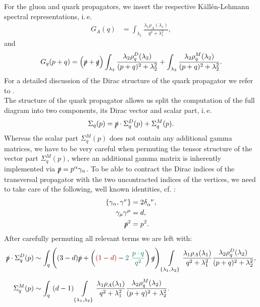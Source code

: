 For the gluon and quark propagators, we insert the respective  K\"all\'{e}n-Lehmann spectral representations, i.\,e.
\begin{align} 
G_A(q)&=\int_{\lambda_1} \frac{\lambda_1\rho_A(\lambda_1)}{q^{2}+\lambda_1^{2}},
\end{align}
and
\begin{equation}
\begin{aligned}
G_q(p+q) = \left(\slashed{p} + \slashed{q}\right) \int_{\lambda_2} \frac{\lambda_2\rho_{q}^D(\lambda_2)}{(p+q)^{2}+\lambda_2^2}+\int_{\lambda_2} \frac{\lambda_2\rho_q^M(\lambda_2)}{(p+q)^{2}+\lambda_2^2}.
\end{aligned}
\end{equation}
For a detailed discussion of the Dirac structure of the quark propagator we refer to . \\
The structure of the quark propagator allows us split the computation of the full diagram into two components, its Dirac vector and scalar part, i.\,e.
\begin{equation}
	\Sigma_q(p) =\slashed{p}\cdot\Sigma_{q}^D(p) + \Sigma_{q}^M(p).
\end{equation}
Whereas the scalar part $\Sigma_{q}^M(p)$ does not contain any additional gamma matrices, we have to be very careful when permuting the tensor structure of the vector part $\Sigma_{q}^M(p)$, where an additional gamma matrix is inherently implemented via $\slashed{p}= p^{\alpha}\gamma_{\alpha}$. To be able to contract the Dirac indices of the transversal propagator with the two uncontracted indices of the vertices, we need to take care of the following, well known identities, cf. \cite{PeskinSchroeder1995}:
\begin{align}
\left\{\gamma_{\alpha},\gamma^{\nu}\right\} &= 2\delta_{\alpha}^{\phantom{{\alpha}}\nu}, \\
\gamma_{\mu}\gamma^{\mu} &= d, \\
\slashed{p}^2 &= p^2.
\end{align}
After carefully permuting all relevant terms we are left with:
\begin{equation}
	\begin{aligned}
		\slashed{p}\cdot\Sigma_{q}^D(p) &\sim \int_q \left((3-d)\slashed{p} + \left(\color{MScRed}(1-d)\normalcolor - \color{MScGreen}2\ \frac{p\cdot q}{q^2}\normalcolor\right)\slashed{q}\right)\int\limits_{\left\{\lambda_1,\lambda_2\right\}} \frac{\lambda_1\rho_A(\lambda_1)}{q^2 + \lambda_1^2} \frac{\lambda_2\rho_q^D(\lambda_2)}{(p+q)^2 + \lambda_2^2}, \\[0.5em]
		\Sigma_{q}^M(p) &\sim \int_q\ (d-1)\int\limits_{\left\{\lambda_1,\lambda_2\right\}} \frac{\lambda_1\rho_A(\lambda_1)}{q^2 + \lambda_1^2} \frac{\lambda_2\rho_q^M(\lambda_2)}{(p+q)^2 + \lambda_2^2}.
	\end{aligned}
\end{equation}
